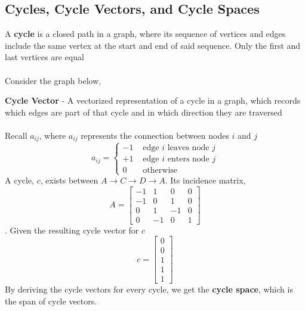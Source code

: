 \subsection{Cycles, Cycle Vectors, and Cycle Spaces}
A \textbf{cycle} is a closed path in a graph, where its sequence of vertices and edges include the same vertex at the start and end of said sequence. Only the first and last vertices are equal \\\\
Consider the graph below,
\begin{center}
\end{center}
\textbf{Cycle Vector} - A vectorized representation of a cycle in a graph, which records which edges are part of that cycle and in which direction they are traversed \\\\
Recall $a_{ij}$, where $a_{ij}$ represents the connection between 
nodes $i$ and $j$
\[
  a_{ij} = \begin{cases}
    -1 & \text{ edge $i$ leaves node $j$} \\
    +1 & \text{ edge $i$ enters node $j$} \\
    0 & \text{ otherwise}
  \end{cases}
\]
A cycle, $c$, exists between $A \rightarrow C \rightarrow D \rightarrow A$. Its incidence matrix,  
\[
  A = \begin{bmatrix} -1 & 1 & 0 & 0 \\ -1 & 0 & 1 & 0 
\\ 0 & 1 & -1 & 0 \\ 0 & -1 & 0 & 1 \end{bmatrix} 
\]. Given the resulting cycle vector for $c$ 
\[
  c = \begin{bmatrix} 0 \\ 0 \\ 1 \\ 1 \\ 1 \end{bmatrix}
\] 
By deriving the cycle vectors for every cycle, we get the \textbf{cycle space}, which is the span of cycle vectors. \\\\
